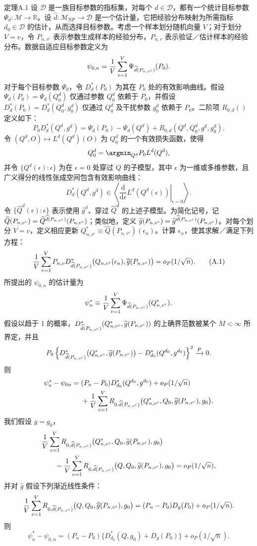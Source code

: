 \begin{bookresult}{定理}{A.1}
设 $\mathcal D$ 是一族目标参数的指标集，对每个 $d\in\mathcal D$，都有一个统计目标参数 $\Psi_d:\mathcal M\to\mathbb R$。设 $\widehat d:\mathcal M_{\mathrm{NP}}\to\mathcal D$ 是一个估计量，它把经验分布映射为所需指标 $d_0\in\mathcal D$ 的估计，从而选择目标参数。考虑一个样本划分随机向量 $V$；对于划分 $V=v$，令 $P_{n,v^c}$ 表示参数生成样本的经验分布，$P_{n,v}$ 表示验证／估计样本的经验分布。数据自适应目标参数定义为
\[
\psi_{0,n}=\frac1V\sum_{v=1}^V\Psi_{\widehat d(P_{n,v^c})}(P_0).
\]
对于每个目标参数 $\Psi_d$，令 $D_d^*(P_0)$ 为其在 $P_0$ 处的有效影响曲线。假设 $\Psi_d(P_0)=\Psi_d(Q_0^d)$ 仅通过参数 $Q_0^d$ 依赖于 $P_0$，并假设 $D_d^*(P_0)=D_d^*(Q_0^d,g_0^d)$ 仅通过 $Q_0^d$ 及干扰参数 $g_0^d$ 依赖于 $P_0$。二阶项 $R_{0,d}()$ 定义如下：
\[
P_0D_d^*(Q^d,g^d)
 =\Psi_d(P_0)-\Psi_d(Q^d)+R_{0,d}(Q^d,Q_0^d,g^d,g_0^d).
\]
令 $(Q^d,O)\mapsto L^d(Q^d)(O)$ 为 $Q_0^d$ 的一个有效损失函数，使得
\[
Q_0^d=\argmin_{Q^d}P_0L^d(Q^d),
\]
并令 $\{Q^d(\epsilon):\epsilon\}$ 为在 $\epsilon=0$ 处穿过 $Q$ 的子模型，其中 $\epsilon$ 为一维或多维参数，且广义得分的线性张成空间包含有效影响曲线：
\[
D_d^*(Q^d,g^d)\in
\left\langle\left.\frac{\mathrm d}{\mathrm d\epsilon}
 L^d(Q^d(\epsilon))\right|_{\epsilon=0}\right\rangle.
\]
令 $\{\widehat Q^d(\epsilon):\epsilon\}$ 表示使用 $\widehat g^d$、穿过 $\widehat Q^d$ 的上述子模型。为简化记号，记 $\widehat Q(P_{n,v^c})=\widehat Q^{\widehat d(P_{n,v^c})}(P_{n,v^c})$；类似地，定义 $\widehat g(P_{n,v^c})=\widehat g^{\widehat d(P_{n,v^c})}(P_{n,v^c})$。对每个划分 $V=v$，定义相应更新 $Q_{n,v^c}^*\equiv\widehat Q(P_{n,v^c})(\epsilon_n)$。计算 $\epsilon_n$，使其求解／满足下列方程：
\begin{equation}
\frac1V\sum_{v=1}^V P_{n,v}D^*_{\widehat d(P_{n,v^c})}
 \bigl(Q_{n,v^c}(\epsilon_n),\widehat g(P_{n,v^c})\bigr)
 =o_P(1/\sqrt n).
\tag{A.1}
\end{equation}
所提出的 $\psi_{0,n}$ 的估计量为
\[
\psi_n^*\equiv\frac1V\sum_{v=1}^V\Psi_{\widehat d(P_{n,v^c})}(Q_{n,v^c}^*).
\]
假设以趋于 1 的概率，$D^*_{\widehat d(P_{n,v^c})}(Q_{n,v^c}^*,\widehat g(P_{n,v^c}))$ 的上确界范数被某个 $M<\infty$ 所界定，并且
\[
P_0\left\{D^*_{\widehat d(P_{n,v^c})}\bigl(Q_{n,v^c}^*,\widehat g(P_{n,v^c})\bigr)
 -D^*_{d_0}(Q^{d_0},g^{d_0})\right\}^2\xrightarrow{P}0.
\]
则
\[
\begin{aligned}
\psi_n^*-\psi_{0n}
={}&(P_n-P_0)D^*_{d_0}(Q^{d_0},g^{d_0})+o_P(1/\sqrt n)\\
&+\frac1V\sum_{v=1}^V R_{0,\widehat d(P_{n,v^c})}
 \bigl(Q_{n,v^c}^*,Q_0,\widehat g(P_{n,v^c}),g_0\bigr).
\end{aligned}
\]
我们假设 $g=g_0$，
\[
\begin{aligned}
&\frac1V\sum_{v=1}^V R_{0,\widehat d(P_{n,v^c})}
 \bigl(Q_{n,v^c}^*,Q_0,\widehat g(P_{n,v^c}),g_0\bigr)\\
&\qquad-\frac1V\sum_{v=1}^V R_{0,\widehat d(P_{n,v^c})}
 \bigl(Q,Q_0,\widehat g(P_{n,v^c}),g_0\bigr)
 =o_P(1/\sqrt n),
\end{aligned}
\]
并对 $\widehat g$ 假设下列渐近线性条件：
\[
\frac1V\sum_{v=1}^V R_{0,\widehat d(P_{n,v^c})}
 \bigl(Q,Q_0,\widehat g(P_{n,v^c}),g_0\bigr)
 =(P_n-P_0)D_g(P_0)+o_P(1/\sqrt n).
\]
则
\[
\psi_n^*-\psi_{0,n}
 =(P_n-P_0)\{D^*_{d_0}(Q,g_0)+D_g(P_0)\}+o_P(1/\sqrt n).
\]
\end{bookresult}

